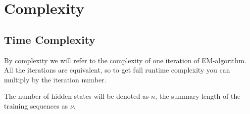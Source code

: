 \documentclass[thesis=M,english]{FITthesis}[2012/10/20]
\begin{document}
\FloatBarrier

\section{Complexity}\label{sec:complex}

\subsection{Time Complexity}

By complexity we will refer to the complexity of one iteration of EM-algorithm. All the iterations are equivalent, so to get full runtime complexity you can multiply by the iteration number.

The number of hidden states will be denoted as $n$, the summary length of the training sequences as $\nu$. 
\end{document}
